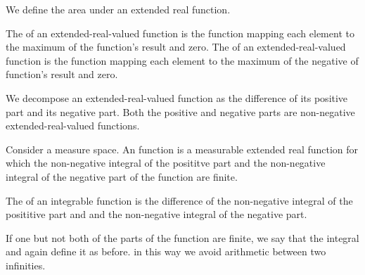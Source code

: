
\sbasic































\sstart
{}


We define the area
under an extended
real function.


The
of an extended-real-valued function
is the function mapping
each element to
the maximum of the function's
result and zero.
The
of an extended-real-valued function
is the function mapping
each element to the maximum
of the negative of function's
result and zero.

We decompose
an extended-real-valued
function as
the difference of
its positive part
and its negative part.
Both the positive and
negative parts
are non-negative
extended-real-valued
functions.

Consider a measure space.
An
function
is a measurable
extended real function
for which
the non-negative integral
of the posititve part
and the non-negative integral
of the negative part of
the function are finite.

The 
of an integrable function
is the difference
of the non-negative integral
of the posititive part and
and the non-negative integral
of the negative part.

If one but not both
of the parts of the function
are finite, we say that the
integral
and again define it as before.
in this
way we avoid arithmetic
between two infinities.

